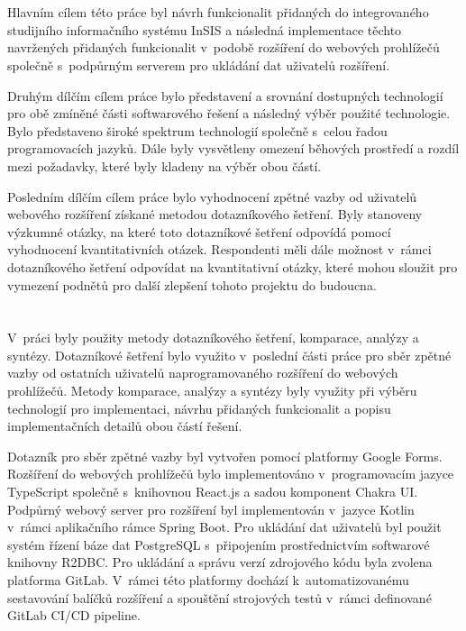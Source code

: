 \section*{\CilPrace}

Hlavním cílem této práce byl návrh funkcionalit přidaných do integrovaného studijního informačního systému InSIS a následná implementace těchto navržených přidaných funkcionalit v~podobě rozšíření do webových prohlížečů společně s~podpůrným serverem pro ukládání dat uživatelů rozšíření. 

Druhým dílčím cílem práce bylo představení a srovnání dostupných technologií pro obě zmíněné části softwarového řešení a následný výběr použité technologie. Bylo představeno široké spektrum technologií společně s~celou řadou programovacích jazyků. Dále byly vysvětleny omezení běhových prostředí a rozdíl mezi požadavky, které byly kladeny na výběr obou částí.  

Posledním dílčím cílem práce bylo vyhodnocení zpětné vazby od uživatelů webového rozšíření získané metodou dotazníkového šetření. Byly stanoveny výzkumné otázky, na které toto dotazníkové šetření odpovídá pomocí vyhodnocení kvantitativních otázek. Respondenti měli dále možnost v~rámci dotazníkového šetření odpovídat na kvantitativní otázky, které mohou sloužit pro vymezení podnětů pro další zlepšení tohoto projektu do budoucna. 

\section*{\PouziteMetody}

V~práci byly použity metody dotazníkového šetření, komparace, analýzy a syntézy. Dotazníkové šetření bylo využito v~poslední části práce pro sběr zpětné vazby od ostatních uživatelů naprogramovaného rozšíření do webových prohlížečů. Metody komparace, analýzy a syntézy byly využity při výběru technologií pro implementaci, návrhu přidaných funkcionalit a popisu implementačních detailů obou částí řešení.    

Dotazník pro sběr zpětné vazby byl vytvořen pomocí platformy Google Forms. Rozšíření do webových prohlížečů bylo implementováno v~programovacím jazyce TypeScript společně s~knihovnou React.js a sadou komponent Chakra UI. Podpůrný webový server pro rozšíření byl implementován v~jazyce Kotlin v~rámci aplikačního rámce Spring Boot. Pro ukládání dat uživatelů byl použit systém řízení báze dat PostgreSQL s~připojením prostřednictvím softwarové knihovny R2DBC. Pro ukládání a správu verzí zdrojového kódu byla zvolena platforma GitLab. V~rámci této platformy dochází k~automatizovanému sestavování balíčků rozšíření a spouštění strojových testů v~rámci definované GitLab CI/CD pipeline.

